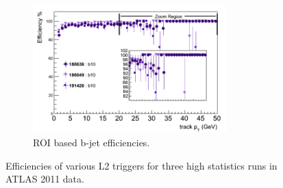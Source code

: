 \begin{figure}[htbp]
\begin{center}
\begin{subfigure}{.5\linewidth}
		\centering
		\includegraphics[width=75mm]{f/b10_IDTrkNoCut_pT_SIT_eff}
		\caption{ROI based b-jet efficiencies.}
		\label{fig:trig_2011_L2_pt_g}
	\end{subfigure}
	\end{center}
	\caption{Efficiencies of various L2 triggers for three high statistics runs in ATLAS 2011 data.}
	\label{fig:trig_2011_L2_pt}
\end{figure}

\clearpage


